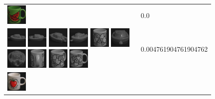 \begin{figure}[!bp]
\begin{tabular}{m{11cm} | m{3cm} |}
\includegraphics[width=1cm]{coil/beeld-30.eps}
& {\scriptsize 0.0}
\\
\includegraphics[width=1cm]{coil/beeld-24.eps}
\includegraphics[width=1cm]{coil/beeld-25.eps}
\includegraphics[width=1cm]{coil/beeld-28.eps}
\includegraphics[width=1cm]{coil/beeld-27.eps}
\includegraphics[width=1cm]{coil/beeld-50.eps}
\includegraphics[width=1cm]{coil/beeld-26.eps}
\includegraphics[width=1cm]{coil/beeld-29.eps}
\includegraphics[width=1cm]{coil/beeld-53.eps}
\includegraphics[width=1cm]{coil/beeld-51.eps}
\includegraphics[width=1cm]{coil/beeld-48.eps}
& {\scriptsize 0.004761904761904762}
\\
\includegraphics[width=1cm]{coil/beeld-36.eps}

\end{tabular}
\end{figure}
